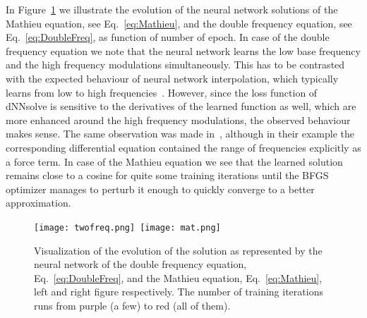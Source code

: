 \documentclass{article}
\begin{document}
In Figure~\ref{fig:colorplot} we illustrate the evolution of the neural network solutions of the Mathieu equation, see Eq.~\ref{eq:Mathieu}, and the double frequency equation, see Eq.~\ref{eq:DoubleFreq}, as function of number of epoch. In case of the double frequency equation we note that the neural network learns the low base frequency and the high frequency modulations simultaneously. This has to be contrasted with the expected behaviour of neural network interpolation, which typically learns from low to high frequencies~\cite{xu2019training}. However, since the loss function of \textsf{dNNsolve} is sensitive to the derivatives of the learned function as well, which are more enhanced around the high frequency modulations, the observed behaviour makes sense. The same observation was made in~\cite{lu2020deepxde}, although in their example the corresponding differential equation contained the range of frequencies explicitly as a force term. In case of the Mathieu equation we see that the learned solution remains close to a cosine for quite some training iterations until the BFGS optimizer manages to perturb it enough to quickly converge to a better approximation.

\begin{figure}[h!]
\begin{center}
  \texttt{[image: twofreq.png]}\, \texttt{[image: mat.png]}\, 
  \caption{Visualization of the evolution of the solution as represented by the neural network of the double frequency equation, Eq.~\ref{eq:DoubleFreq}, and the Mathieu equation, Eq.~\ref{eq:Mathieu}, left and right figure respectively. The number of training iterations runs from purple (a few) to red (all of them). }
  \label{fig:colorplot}
  \end{center}
\end{figure}
\end{document}
